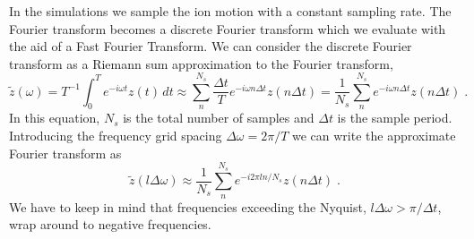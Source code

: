 \documentclass[aps, pra, preprint]{revtex4-1}
\begin{document}
In the simulations we sample the ion motion with a constant
sampling rate. The Fourier transform becomes a discrete Fourier
transform which we evaluate with the aid of a Fast Fourier
Transform. We can consider the discrete Fourier transform as a
Riemann sum approximation to the Fourier transform,
\begin{equation}
  \tilde{z}(\omega)=
  T^{-1}\int_0^Te^{-i\omega t}z(t)\,dt \approx
  \sum_n^{N_s}\frac{\Delta t}{T}e^{-i\omega n\Delta t}z(n \Delta t) =
  \frac{1}{N_s}\sum_n^{N_s}e^{-i\omega n\Delta t}z(n \Delta t)\;.
\end{equation}
In this equation, $N_s$ is the total number of samples and
$\Delta t$ is the sample period. Introducing the frequency grid
spacing $\Delta\omega=2\pi/T$ we can write the approximate
Fourier transform as
\begin{equation}
  \tilde{z}(l\Delta\omega)\approx
  \frac{1}{N_s}\sum_n^{N_s}e^{-i2\pi ln/N_s}z(n \Delta t)\;.
\end{equation}
We have to keep in mind that frequencies exceeding the Nyquist,
$l\Delta\omega>\pi/\Delta t$, wrap around to negative
frequencies.
\end{document}
